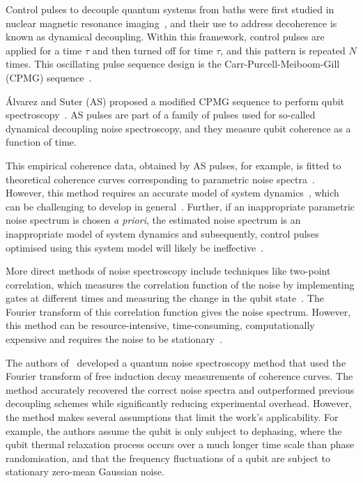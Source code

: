 \documentclass[12pt]{iopart}
\begin{document}
Control pulses to decouple quantum systems from baths were first studied in nuclear magnetic resonance imaging~\cite{degen2017quantum, boss2016one}, and their use to address decoherence is known as dynamical decoupling. Within this framework, control pulses are applied for a time $\tau$ and then turned off for time $\tau$, and this pattern is repeated $N$ times. This oscillating pulse sequence design is the Carr-Purcell-Meiboom-Gill (CPMG) sequence~\cite{carr1954effects, meiboom1958modified}.

\'Alvarez and Suter (AS) proposed a modified CPMG sequence to perform qubit spectroscopy~\cite{alvarez2011measuring}. AS pulses are part of a family of pulses used for so-called dynamical decoupling noise spectroscopy, and they measure qubit coherence as a function of time.

This empirical coherence data, obtained by AS pulses, for example, is fitted to theoretical coherence curves corresponding to parametric noise spectra~\cite{von2020two, sun2022self}. However, this method requires an accurate model of system dynamics~\cite{wise2021using}, which can be challenging to develop in general~\cite{martina2021machine}. Further, if an inappropriate parametric noise spectrum is chosen \textit{a priori}, the estimated noise spectrum is an inappropriate model of system dynamics and subsequently, control pulses optimised using this system model will likely be ineffective~\cite{martina2021machine}.

More direct methods of noise spectroscopy include techniques like two-point correlation, which measures the correlation function of the noise by implementing gates at different times and measuring the change in the qubit state~\cite{baroni2022nuclear}. The Fourier transform of this correlation function gives the noise spectrum. However, this method can be resource-intensive, time-consuming, computationally expensive and requires the noise to be stationary~\cite{von2020two,wise2021using,martina2023deep,vezvaee2022noise}.

The authors of~\cite{vezvaee2022noise} developed a quantum noise spectroscopy method that used the Fourier transform of free induction decay measurements of coherence curves. The method accurately recovered the correct noise spectra and outperformed previous decoupling schemes while significantly reducing experimental overhead. However, the method makes several assumptions that limit the work's applicability. For example, the authors assume the qubit is only subject to dephasing, where the qubit thermal relaxation process occurs over a much longer time scale than phase randomisation, and that the frequency fluctuations of a qubit are subject to stationary zero-mean Gaussian noise.
\end{document}

